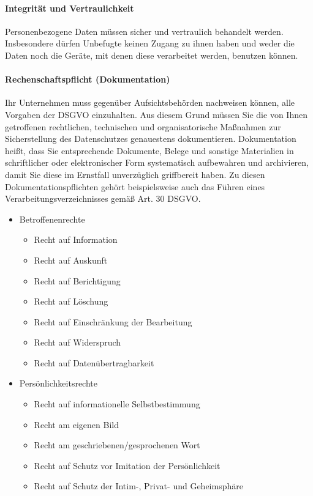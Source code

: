 \paragraph{Integrität und Vertraulichkeit} Personenbezogene Daten müssen sicher und vertraulich behandelt werden. Insbesondere dürfen Unbefugte keinen Zugang zu ihnen haben und weder die Daten noch die Geräte, mit denen diese verarbeitet werden, benutzen können.

\paragraph{Rechenschaftspflicht (Dokumentation)} Ihr Unternehmen muss gegenüber Aufsichtsbehörden nachweisen können, alle Vorgaben der DSGVO einzuhalten. Aus diesem Grund müssen Sie die von Ihnen getroffenen rechtlichen, technischen und organisatorische Maßnahmen zur Sicherstellung des Datenschutzes genauestens dokumentieren. Dokumentation heißt, dass Sie entsprechende Dokumente, Belege und sonstige Materialien in schriftlicher oder elektronischer Form systematisch aufbewahren und archivieren, damit Sie diese im Ernstfall unverzüglich griffbereit haben. Zu diesen Dokumentationspflichten gehört beispielsweise auch das Führen eines Verarbeitungsverzeichnisses gemäß Art. 30 DSGVO.


\begin{itemize}
	\item Betroffenenrechte
	\begin{itemize}
		\item Recht auf Information
		\item Recht auf Auskunft
		\item Recht auf Berichtigung
		\item Recht auf Löschung
		\item Recht auf Einschränkung der Bearbeitung
		\item Recht auf Widerspruch
		\item Recht auf Datenübertragbarkeit
	\end{itemize}
	\item Persönlichkeitsrechte
	\begin{itemize}
		\item Recht auf informationelle Selbstbestimmung
		\item Recht am eigenen Bild
		\item Recht am geschriebenen/gesprochenen Wort
		\item Recht auf Schutz vor Imitation der Persönlichkeit
		\item Recht auf Schutz der Intim-, Privat- und Geheimsphäre
	\end{itemize}
\end{itemize}